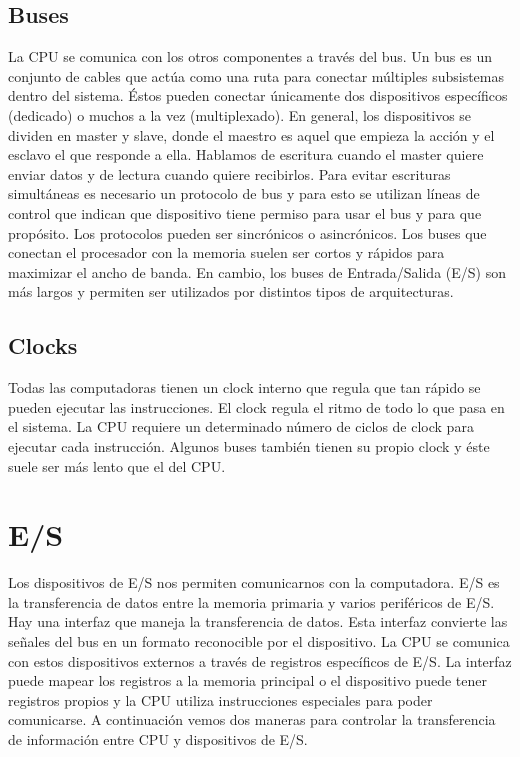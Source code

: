 \documentclass[a4paper,12pt]{article}
\begin{document}
\subsection{Buses}
La CPU se comunica con los otros componentes a través del bus. Un bus es un conjunto de cables que actúa como una ruta
para conectar múltiples subsistemas dentro del sistema. Éstos pueden conectar únicamente dos dispositivos específicos
(dedicado) o muchos a la vez (multiplexado). En general, los dispositivos se dividen en master y slave, donde el maestro
es aquel que empieza la acción y el esclavo el que responde a ella. Hablamos de escritura cuando el master quiere enviar
datos y de lectura cuando quiere recibirlos. Para evitar escrituras simultáneas es necesario un protocolo de bus y para
esto se utilizan líneas de control que indican que dispositivo tiene permiso para usar el bus y para que propósito. Los
protocolos pueden ser sincrónicos o asincrónicos. Los buses que conectan el procesador con la memoria suelen ser cortos
y rápidos para maximizar el ancho de banda. En cambio, los buses de Entrada/Salida (E/S) son más largos y permiten ser
utilizados por distintos tipos de arquitecturas.

\subsection{Clocks}
Todas las computadoras tienen un clock interno que regula que tan rápido se pueden ejecutar las instrucciones. El clock
regula el ritmo de todo lo que pasa en el sistema. La CPU requiere un determinado número de ciclos de clock para ejecutar
cada instrucción. Algunos buses también tienen su propio clock y éste suele ser más lento que el del CPU.





\section{E/S}
Los dispositivos de E/S nos permiten comunicarnos con la computadora. E/S es la transferencia de datos entre la memoria
primaria y varios periféricos de E/S. Hay una interfaz que maneja la transferencia de datos. Esta interfaz convierte
las señales del bus en un formato reconocible por el dispositivo. La CPU se comunica con estos dispositivos externos
a través de registros específicos de E/S. La interfaz puede mapear los registros a la memoria principal o el dispositivo
puede tener registros propios y la CPU utiliza instrucciones especiales para poder comunicarse. A continuación vemos dos
maneras para controlar la transferencia de información entre CPU y dispositivos de E/S.
\end{document}
